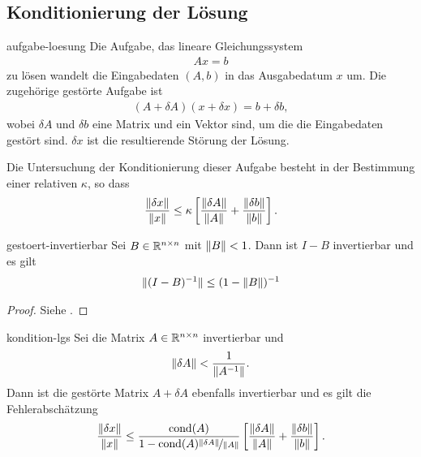 \subsection{Konditionierung der Lösung}

\begin{Definition}{aufgabe-loesung}
  Die Aufgabe, das lineare Gleichungssystem
  \begin{gather}
    Ax=b
  \end{gather}
  zu lösen wandelt die Eingabedaten $(A,b)$ in das Ausgabedatum $x$
  um. Die zugehörige gestörte Aufgabe ist
  \begin{gather}
    (A+\delta A) (x+\delta x) = b+ \delta b,
  \end{gather}
  wobei $\delta A$ und $\delta b$ eine Matrix und ein Vektor sind, um
  die die Eingabedaten gestört sind. $\delta x$ ist die resultierende
  Störung der Lösung.
  
  Die Untersuchung der Konditionierung dieser Aufgabe besteht in
  der Bestimmung einer relativen  $\kappa$, so dass
  \begin{gather}
    \frac{\lVert\delta x\rVert}{\lVert x\rVert}
    \le \kappa \left[\frac{\lVert\delta A\rVert}{\lVert A\rVert}
      +\frac{\lVert\delta b\rVert}{\lVert b\rVert}\right].
  \end{gather}
\end{Definition}

\begin{Lemma}{gestoert-invertierbar}
  Sei $B\in \mathbb R^{n\times n}$ mit $\lVert B\rVert < 1$. Dann ist $I-B$
  invertierbar und es gilt
  \begin{gather}
    \lVert(I-B)^{-1}\rVert \le (1-\lVert B\rVert)^{-1}
  \end{gather}
\end{Lemma}

\begin{proof}
  Siehe \cite[Hilfssatz 4.4]{Rannacher17}.
\end{proof}

\begin{Satz}{kondition-lgs}
  Sei die Matrix $A\in\mathbb R^{n\times n}$ invertierbar und
  \begin{gather}
    \label{eq:la1:1}
    \lVert\delta A\rVert < \frac1{\lVert A^{-1}\rVert}.
  \end{gather}
  Dann ist die gestörte Matrix $A+\delta A$ ebenfalls invertierbar und
  es gilt die Fehlerabschätzung
  \begin{gather}
    \frac{\lVert\delta x\rVert}{\lVert x\rVert}
    \le \frac{\operatorname{cond}(A)}{1-\operatorname{cond}(A)\nicefrac{\lVert\delta A\rVert}{{\lVert A\rVert}}}
    \left[\frac{\lVert\delta A\rVert}{\lVert A\rVert}
      +\frac{\lVert\delta b\rVert}{\lVert b\rVert}\right].
  \end{gather}
\end{Satz}

